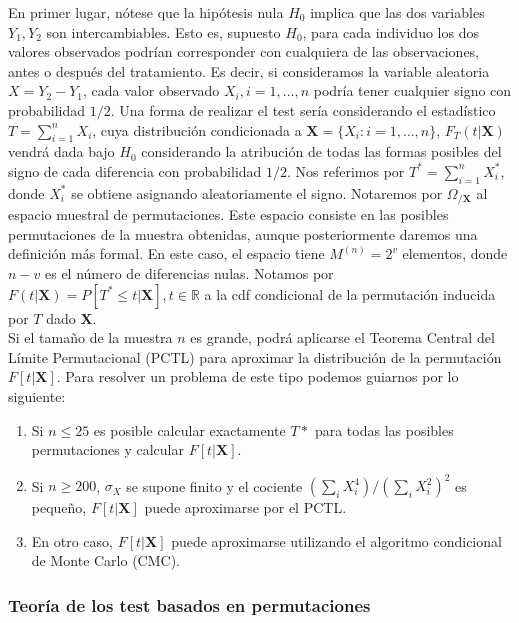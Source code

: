 	En primer lugar, nótese que la hipótesis nula $H_0$ implica que las dos variables $Y_1, Y_2$ son intercambiables. Esto es, supuesto $H_0$, para cada individuo los dos valores observados podrían corresponder con cualquiera de las observaciones, antes o después del tratamiento. Es decir, si consideramos la variable aleatoria $X = Y_2 - Y_1$, cada valor observado $X_i, i=1, \dots, n$ podría tener cualquier signo con probabilidad $1/2$. Una forma de realizar el test sería considerando el estadístico $T = \sum\limits_{i=1}^n X_i$, cuya distribución condicionada a $\mathbf{X} = \{X_i: i = 1, \dots, n\}$, $F_T(t|\mathbf{X})$ vendrá dada bajo $H_0$ considerando la atribución de todas las formas posibles del signo de cada diferencia con probabilidad $1/2$. Nos referimos por $T^* = \sum\limits_{i=1}^n X_i^*$, donde $X_i^*$ se obtiene asignando aleatoriamente el signo. Notaremos por $\Omega_{/\mathbf{X}}$ al espacio muestral de permutaciones. Este espacio consiste en las posibles permutaciones de la muestra obtenidas, aunque posteriormente daremos una definición más formal. En este caso, el espacio tiene $M^{(n)} = 2^v$ elementos, donde $n-v$ es el número de diferencias nulas. Notamos por $F(t|\mathbf{X}) = P[T^* \leq t | \mathbf{X}], t \in \mathbb{R}$ a la cdf condicional de la permutación inducida por $T$ dado $\mathbf{X}$.\\
	Si el tamaño de la muestra $n$ es grande, podrá aplicarse el Teorema Central del Límite Permutacional (PCTL) para aproximar la distribución de la permutación $F[t|\mathbf{X}]$. Para resolver un problema de este tipo podemos guiarnos por lo siguiente:
	
\begin{enumerate}[a]
	\item Si $n \leq 25$ es posible calcular exactamente $T*$ para todas las posibles permutaciones y calcular $F[t|\mathbf{X}]$.
	\item Si $n \geq 200$, $\sigma_X$ se supone finito y el cociente $(\sum_i X_i^4)/(\sum_i X_i^2)^2$ es pequeño, $F[t|\mathbf{X}]$ puede aproximarse por el PCTL. 
	\item En otro caso, $F[t|\mathbf{X}]$ puede aproximarse utilizando el algoritmo condicional de Monte Carlo (CMC).
\end{enumerate}
	
\subsubsection{Teoría de los test basados en permutaciones}

